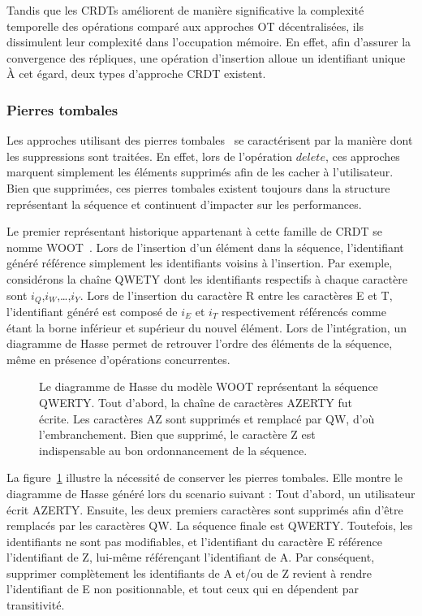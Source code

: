 Tandis que les CRDTs améliorent de manière significative la complexité
temporelle des opérations comparé aux approches OT décentralisées, ils
dissimulent leur complexité dans l'occupation mémoire. En effet, afin d'assurer
la convergence des répliques, une opération d'insertion alloue un identifiant
unique  À cet égard, deux types d'approche CRDT existent.

\subsubsection{Pierres tombales}

Les approches utilisant des pierres tombales~\cite{ahmed2011evaluating,
  conway2014language, grishchenko2010deep, oster2006data,
  preguica2009commutative, roh2011replicated, weiss2007wooki, wu2010partial,
  yu2012stringwise} se caractérisent par la manière dont les suppressions sont
traitées. En effet, lors de l'opération $delete$, ces approches marquent
simplement les éléments supprimés afin de les cacher à l'utilisateur. Bien que
supprimées, ces pierres tombales existent toujours dans la structure
représentant la séquence et continuent d'impacter sur les performances.

Le premier représentant historique appartenant à cette famille de CRDT se nomme
WOOT~\cite{oster2006data}. Lors de l'insertion d'un élément dans la séquence,
l'identifiant généré référence simplement les identifiants voisins à
l'insertion. Par exemple, considérons la chaîne QWETY dont les identifiants
respectifs à chaque caractère sont $i_Q$,$i_W$,\ldots,$i_Y$. Lors de l'insertion
du caractère R entre les caractères E et T, l'identifiant généré est composé de
$i_E$ et $i_T$ respectivement référencés comme étant la borne inférieur et
supérieur du nouvel élément. Lors de l'intégration, un diagramme de Hasse permet
de retrouver l'ordre des éléments de la séquence, même en présence d'opérations
concurrentes. 

\begin{figure}
  \centering
  
  \caption{\label{fig:lseq:wootexample}Le diagramme de Hasse du modèle WOOT
    représentant la séquence QWERTY. Tout d'abord, la chaîne de caractères
    AZERTY fut écrite. Les caractères AZ sont supprimés et remplacé par QW, d'où
    l'embranchement. Bien que supprimé, le caractère Z est indispensable au bon
    ordonnancement de la séquence.}
\end{figure}

La figure~\ref{fig:lseq:wootexample} illustre la nécessité de conserver les
pierres tombales. Elle montre le diagramme de Hasse généré lors du scenario
suivant : Tout d'abord, un utilisateur écrit AZERTY. Ensuite, les deux premiers
caractères sont supprimés afin d'être remplacés par les caractères QW. La
séquence finale est QWERTY. Toutefois, les identifiants ne sont pas modifiables,
et l'identifiant du caractère E référence l'identifiant de Z, lui-même
référençant l'identifiant de A. Par conséquent, supprimer complètement les
identifiants de A et/ou de Z revient à rendre l'identifiant de E non
positionnable, et tout ceux qui en dépendent par transitivité.

